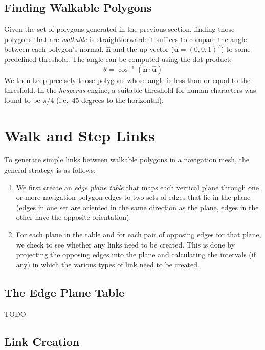 \documentclass[10pt,twocolumn]{article}
\begin{document}
\subsection{Finding Walkable Polygons}

Given the set of polygons generated in the previous section, finding those polygons that are \emph{walkable} is straightforward: it suffices to compare the angle between each polygon's normal, $\mathbf{\hat{n}}$ and the up vector ($\mathbf{\hat{u}} = (0,0,1)^T$) to some predefined threshold. The angle can be computed using the dot product:
%
\[
\theta = \cos^{-1} \left( \mathbf{\hat{n}} \cdot \mathbf{\hat{u}} \right)
\]
%
We then keep precisely those polygons whose angle is less than or equal to the threshold. In the \emph{hesperus} engine, a suitable threshold for human characters was found to be $\pi/4$ (i.e.~45 degrees to the horizontal).

\section{Walk and Step Links}
\label{sec:walkstep}

To generate simple links between walkable polygons in a navigation mesh, the general strategy is as follows:
%
\begin{enumerate}
\item We first create an \emph{edge plane table} that maps each vertical plane through one or more navigation polygon edges to two sets of edges that lie in the plane (edges in one set are oriented in the same direction as the plane, edges in the other have the opposite orientation).
\item For each plane in the table and for each pair of opposing edges for that plane, we check to see whether any links need to be created. This is done by projecting the opposing edges into the plane and calculating the intervals (if any) in which the various types of link need to be created.
\end{enumerate}

\subsection{The Edge Plane Table}

TODO

\subsection{Link Creation}
\end{document}
